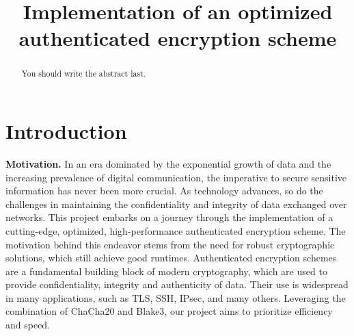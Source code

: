 \documentclass[letterpaper]{article}
\title{Implementation of an optimized authenticated encryption scheme}
\newcommand{\mypar}[1]{{\bf #1.}}
\begin{document}
%
\maketitle
%


\begin{abstract}
You should write the abstract last.
\end{abstract}

\section{Introduction}\label{sec:intro}


\mypar{Motivation}
%
%
In an era dominated by the exponential growth of data and the increasing prevalence of digital communication,
the imperative to secure sensitive information has never been more crucial.
As technology advances, so do the challenges in maintaining the confidentiality and integrity of data exchanged over networks.
This project embarks on a journey through the implementation of a cutting-edge,
optimized, high-performance authenticated encryption scheme.
The motivation behind this endeavor stems from the need for robust cryptographic solutions, which still achieve good runtimes.
Authenticated encryption schemes are a fundamental building block of modern cryptography, which
are used to provide confidentiality, integrity and authenticity of data.
Their use is widespread in many applications, such as TLS, SSH, IPsec, and many others.
Leveraging the combination of ChaCha20 and Blake3, our project aims to prioritize efficiency and speed.
\end{document}
